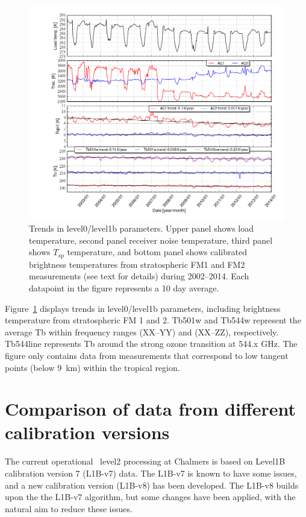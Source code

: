 \begin{figure}
\includegraphics[width=14cm]{tspill_trend3.png}
\caption{Trends in level0/level1b parameters. Upper panel shows load temperature,
second panel receiver noise temperature, third panel shows \(T_{sp}\) temperature,
and bottom panel shows calibrated brightness temperatures from stratospheric FM1
and FM2 measurements (see text for details) during 2002--2014. Each datapoint
in the figure represents a 10 day average. }
\label{fig:tbtrend}
\end{figure}


Figure~\ref{fig:tbtrend} displays trends in level0/level1b parameters, including brightness 
temperature from stratospheric FM 1 and 2. Tb501w and Tb544w represent the average
Tb within frequency ranges (XX--YY) and (XX--ZZ), respectively. Tb544line represents Tb around the
strong ozone transition at 544.x GHz. The figure only contains data from measurements
that correspond to low tangent points (below 9~km) within the tropical region.




   
\chapter{Comparison of data from different calibration versions}

The current operational \smr\ level2 processing at Chalmers is based on 
Level1B calibration version 7 (L1B-v7) data. 
The L1B-v7 is known to have some issues, and a new calibration version
(L1B-v8) has been developed. The L1B-v8 builds upon the the L1B-v7 algorithm,
but some changes have been applied, with the natural aim to reduce these issues.  


